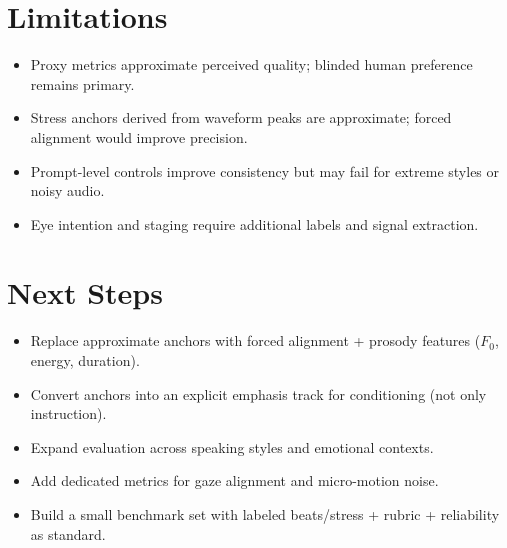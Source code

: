 \documentclass[11pt,a4paper]{article}
\begin{document}
\section{Limitations}

\begin{itemize}[leftmargin=2em]
    \item Proxy metrics approximate perceived quality; blinded human preference remains primary.
    \item Stress anchors derived from waveform peaks are approximate; forced alignment would improve precision.
    \item Prompt-level controls improve consistency but may fail for extreme styles or noisy audio.
    \item Eye intention and staging require additional labels and signal extraction.
\end{itemize}

\section{Next Steps}

\begin{itemize}[leftmargin=2em]
    \item Replace approximate anchors with forced alignment + prosody features ($F_0$, energy, duration).
    \item Convert anchors into an explicit emphasis track for conditioning (not only instruction).
    \item Expand evaluation across speaking styles and emotional contexts.
    \item Add dedicated metrics for gaze alignment and micro-motion noise.
    \item Build a small benchmark set with labeled beats/stress + rubric + reliability as standard.
\end{itemize}
\end{document}
